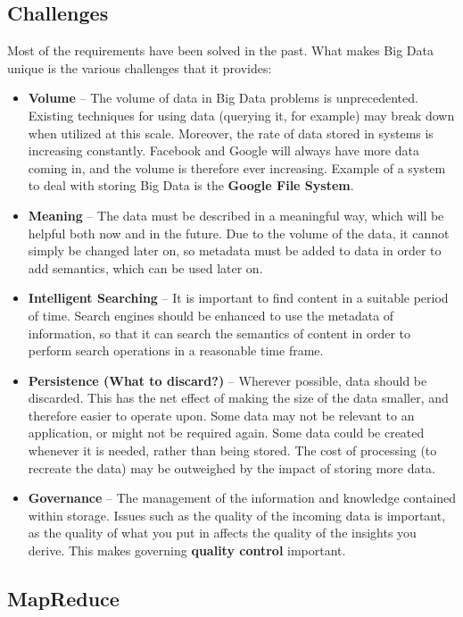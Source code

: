 \documentclass{article}
\begin{document}
\subsection{Challenges}

Most of the requirements have been solved in the past. What makes Big Data unique is the various challenges that it provides:
\begin{itemize}
	\item \textbf{Volume} -- The volume of data in Big Data problems is unprecedented. Existing techniques for using data (querying it, for example) may break down when utilized at this scale. Moreover, the rate of data stored in systems is increasing constantly. Facebook and Google will always have more data coming in, and the volume is therefore ever increasing. Example of a system to deal with storing Big Data is the \textbf{Google File System}.
	\item \textbf{Meaning} -- The data must be described in a meaningful way, which will be helpful both now and in the future. Due to the volume of the data, it cannot simply be changed later on, so metadata must be added to data in order to add semantics, which can be used later on.
	\item \textbf{Intelligent Searching} -- It is important to find content in a suitable period of time. Search engines should be enhanced to use the metadata of information, so that it can search the semantics of content in order to perform search operations in a reasonable time frame.
	\item \textbf{Persistence (What to discard?)} -- Wherever possible, data should be discarded. This has the net effect of making the size of the data smaller, and therefore easier to operate upon. Some data may not be relevant to an application, or might not be required again. Some data could be created whenever it is needed, rather than being stored. The cost of processing (to recreate the data) may be outweighed by the impact of storing more data.
	\item \textbf{Governance} -- The management of the information and knowledge contained within storage. Issues such as the quality of the incoming data is important, as the quality of what you put in affects the quality of the insights you derive. This makes governing \textbf{quality control} important.
\end{itemize}

\subsection{MapReduce}
\end{document}
